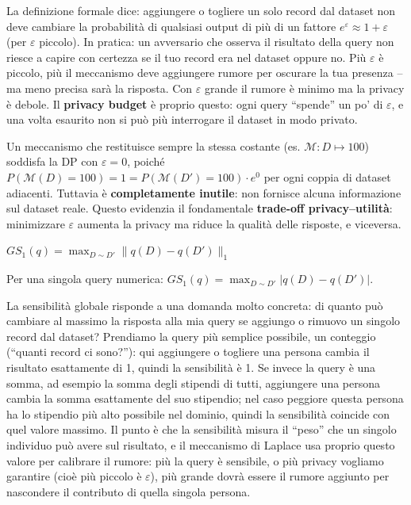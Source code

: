 \documentclass[a4paper,11pt]{article}
\begin{document}
\begin{nota}
La definizione formale dice: aggiungere o togliere un solo record dal dataset non deve cambiare la probabilità di qualsiasi output di più di un fattore $e^\varepsilon \approx 1 + \varepsilon$ (per $\varepsilon$ piccolo). In pratica: un avversario che osserva il risultato della query non riesce a capire con certezza se il tuo record era nel dataset oppure no. Più $\varepsilon$ è piccolo, più il meccanismo deve aggiungere rumore per oscurare la tua presenza -- ma meno precisa sarà la risposta. Con $\varepsilon$ grande il rumore è minimo ma la privacy è debole. Il \textbf{privacy budget} è proprio questo: ogni query ``spende'' un po' di $\varepsilon$, e una volta esaurito non si può più interrogare il dataset in modo privato.
\end{nota}

\begin{nota}
Un meccanismo che restituisce sempre la stessa costante (es. $\mathcal{M}: D \mapsto 100$) soddisfa la DP con $\varepsilon = 0$, poich\'{e} $P(\mathcal{M}(D) = 100) = 1 = P(\mathcal{M}(D') = 100) \cdot e^0$ per ogni coppia di dataset adiacenti. Tuttavia \`{e} \textbf{completamente inutile}: non fornisce alcuna informazione sul dataset reale. Questo evidenzia il fondamentale \textbf{trade-off privacy--utilit\`{a}}: minimizzare $\varepsilon$ aumenta la privacy ma riduce la qualit\`{a} delle risposte, e viceversa.
\end{nota}

\begin{definizione}
$GS_1(q) = \max_{D \sim D'} \|q(D) - q(D')\|_1$

Per una singola query numerica: $GS_1(q) = \max_{D \sim D'} |q(D) - q(D')|$.
\end{definizione}

\begin{nota}
La sensibilità globale risponde a una domanda molto concreta: di quanto può cambiare al massimo la risposta alla mia query se aggiungo o rimuovo un singolo record dal dataset? Prendiamo la query più semplice possibile, un conteggio (``quanti record ci sono?''): qui aggiungere o togliere una persona cambia il risultato esattamente di 1, quindi la sensibilità è 1. Se invece la query è una somma, ad esempio la somma degli stipendi di tutti, aggiungere una persona cambia la somma esattamente del suo stipendio; nel caso peggiore questa persona ha lo stipendio più alto possibile nel dominio, quindi la sensibilità coincide con quel valore massimo. Il punto è che la sensibilità misura il ``peso'' che un singolo individuo può avere sul risultato, e il meccanismo di Laplace usa proprio questo valore per calibrare il rumore: più la query è sensibile, o più privacy vogliamo garantire (cioè più piccolo è $\varepsilon$), più grande dovrà essere il rumore aggiunto per nascondere il contributo di quella singola persona.
\end{nota}
\end{document}
